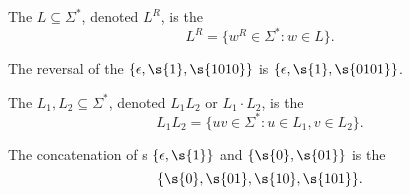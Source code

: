\begin{flex}
\begin{solution}
\end{solution}
\end{flex}


\begin{flex}
\begin{definition} \label{definition:Reversal-of-a-language}
The  $L \subseteq \Sigma^*$, denoted $L^R$, is the 
\[
    L^R = \{w^R \in \Sigma^* : w \in L\}. 
\]
\end{definition}

\begin{example} \label{example:Reversal-of-epsilon-1-1010}
The reversal of the  $\{\epsilon, \s{1}, \s{1010}\}$ is $\{\epsilon, \s{1}, \s{0101}\}$.
\end{example}
\end{flex}


\begin{flex}
\begin{definition} \label{definition:Concatenation-of-languages}
The  $L_1, L_2 \subseteq \Sigma^*$, denoted $L_1L_2$ or $L_1 \cdot L_2$, is the 
\[
    L_1L_2 = \{uv \in \Sigma^* : u \in L_1, v \in L_2\}.
\]
\end{definition}

\begin{example} \label{example:Concatenation-of-epsilon-1-and-0-01}
The concatenation of s $\{\epsilon, \s{1}\}$ and $\{\s{0}, \s{01}\}$ is the 
\[
    \{\s{0}, \s{01}, \s{10}, \s{101}\}.
\] 
\end{example}
\end{flex}


